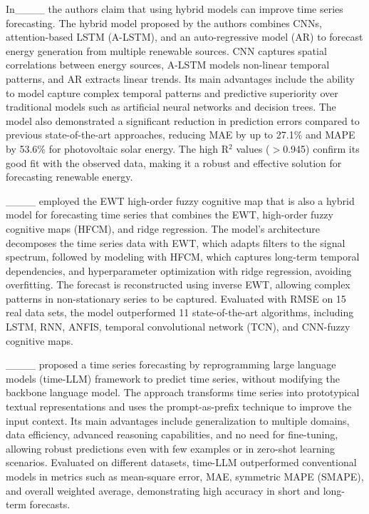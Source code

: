 In____ the authors claim that using hybrid models can improve time series forecasting. The hybrid model proposed by the authors combines CNNs, attention-based LSTM (A-LSTM), and an auto-regressive model (AR) to forecast energy generation from multiple renewable sources. CNN captures spatial correlations between energy sources, A-LSTM models non-linear temporal patterns, and AR extracts linear trends. Its main advantages include the ability to model capture complex temporal patterns and predictive superiority over traditional models such as artificial neural networks and decision trees. The model also demonstrated a significant reduction in prediction errors compared to previous state-of-the-art approaches, reducing MAE by up to 27.1\% and MAPE by 53.6\% for photovoltaic solar energy. The high R$^{2}$ values ($>$0.945) confirm its good fit with the observed data, making it a robust and effective solution for forecasting renewable energy.

____ employed the EWT high-order fuzzy cognitive map that is also a hybrid model for forecasting time series that combines the EWT, high-order fuzzy cognitive maps (HFCM), and ridge regression. The model's architecture decomposes the time series data with EWT, which adapts filters to the signal spectrum, followed by modeling with HFCM, which captures long-term temporal dependencies, and hyperparameter optimization with ridge regression, avoiding overfitting. The forecast is reconstructed using inverse EWT, allowing complex patterns in non-stationary series to be captured. Evaluated with RMSE on 15 real data sets, the model outperformed 11 state-of-the-art algorithms, including LSTM, RNN, ANFIS, temporal convolutional network (TCN), and CNN-fuzzy cognitive maps.

____ proposed a time series forecasting by reprogramming large language models (time-LLM) framework to predict time series, without modifying the backbone language model. The approach transforms time series into prototypical textual representations and uses the prompt-as-prefix technique to improve the input context. Its main advantages include generalization to multiple domains, data efficiency, advanced reasoning capabilities, and no need for fine-tuning, allowing robust predictions even with few examples or in zero-shot learning scenarios. Evaluated on different datasets, time-LLM outperformed conventional models in metrics such as mean-square error, MAE, symmetric MAPE (SMAPE), and overall weighted average, demonstrating high accuracy in short and long-term forecasts.

